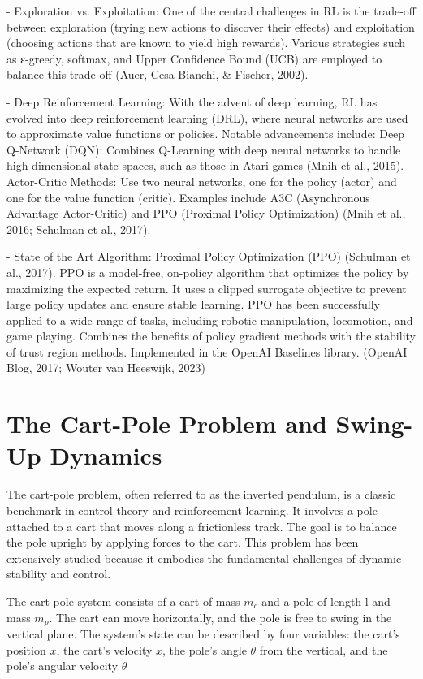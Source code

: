 - Exploration vs. Exploitation: One of the central challenges in RL is the trade-off between exploration (trying new actions to discover their effects) and exploitation (choosing actions that are known to yield high rewards). Various strategies such as ε-greedy, softmax, and Upper Confidence Bound (UCB) are employed to balance this trade-off (Auer, Cesa-Bianchi, & Fischer, 2002).

- Deep Reinforcement Learning: With the advent of deep learning, RL has evolved into deep reinforcement learning (DRL), where neural networks are used to approximate value functions or policies. Notable advancements include: Deep Q-Network (DQN): Combines Q-Learning with deep neural networks to handle high-dimensional state spaces, such as those in Atari games (Mnih et al., 2015). Actor-Critic Methods: Use two neural networks, one for the policy (actor) and one for the value function (critic). Examples include A3C (Asynchronous Advantage Actor-Critic) and PPO (Proximal Policy Optimization) (Mnih et al., 2016; Schulman et al., 2017).

- State of the Art Algorithm: Proximal Policy Optimization (PPO) (Schulman et al., 2017). PPO is a model-free, on-policy algorithm that optimizes the policy by maximizing the expected return. It uses a clipped surrogate objective to prevent large policy updates and ensure stable learning. PPO has been successfully applied to a wide range of tasks, including robotic manipulation, locomotion, and game playing. Combines the benefits of policy gradient methods with the stability of trust region methods. Implemented in the OpenAI Baselines library. (OpenAI Blog, 2017; Wouter van Heeswijk, 2023)

\section{The Cart-Pole Problem and Swing-Up Dynamics}
The cart-pole problem, often referred to as the inverted pendulum, is a classic benchmark in control theory and reinforcement learning. It involves a pole attached to a cart that moves along a frictionless track. The goal is to balance the pole upright by applying forces to the cart. This problem has been extensively studied because it embodies the fundamental challenges of dynamic stability and control.

The cart-pole system consists of a cart of mass $m_c$ and a pole of length l and mass $m_p$. The cart can move horizontally, and the pole is free to swing in the vertical plane. The system's state can be described by four variables: the cart's position $x$, the cart's velocity $\dot{x}$, the pole's angle $\theta$ from the vertical, and the pole's angular velocity $\dot{\theta}$

